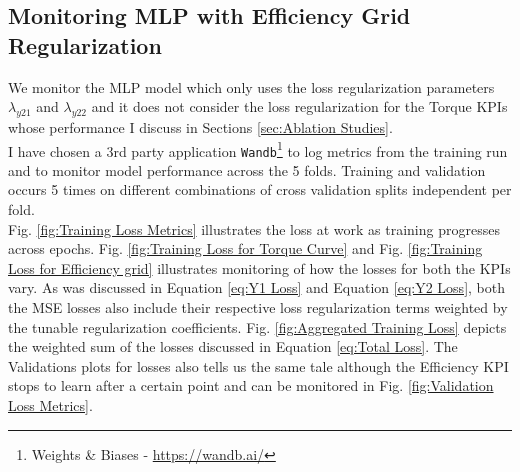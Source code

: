 \documentclass{report} %
\begin{document}
\subsection{Monitoring MLP with Efficiency Grid Regularization}\label{subsec:Monitoring MLP with Efficiency Grid Regularization}

We monitor the \ac{MLP} model which only uses the loss regularization parameters \textit{$\lambda_{y21}$} and \textit{$\lambda_{y22}$} and it does not consider the loss  
regularization for the Torque \ac{KPI}s whose performance I discuss in Sections \ref{sec:Ablation Studies}.\\
I have chosen a 3rd party application \texttt{Wandb}\footnote{Weights \& Biases - \url{https://wandb.ai/}} to log metrics from the training run and to monitor model 
performance across the 5 folds. Training and validation occurs 5 times on different combinations of cross validation splits independent per fold.\\

Fig. \ref{fig:Training Loss Metrics} illustrates the loss at work as training progresses across epochs. 
Fig. \ref{fig:Training Loss for Torque Curve} and Fig. \ref{fig:Training Loss for Efficiency grid} illustrates monitoring of how the losses for both the \ac{KPI}s vary. 
As was discussed in Equation \ref{eq:Y1 Loss} and Equation \ref{eq:Y2 Loss}, both the \ac{MSE} losses 
also include their respective loss regularization terms weighted by the tunable regularization coefficients. 
Fig. \ref{fig:Aggregated Training Loss} depicts the weighted sum of the losses discussed in Equation \ref{eq:Total Loss}.
The Validations plots for losses also tells us the same tale although the Efficiency \ac{KPI} stops to learn after a certain point and can be monitored in Fig. 
\ref{fig:Validation Loss Metrics}.
\end{document}

